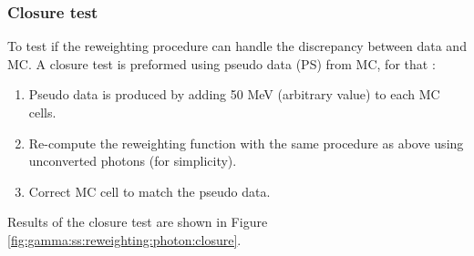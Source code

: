\subsubsection{Closure test}
To test if the reweighting procedure can handle the discrepancy between data and MC. A closure test is preformed using pseudo data (PS) from MC, for that :
\begin{enumerate}
    \item Pseudo data is produced by adding 50 MeV (arbitrary value) to each MC cells.
    \item Re-compute the reweighting function with the same procedure as above using unconverted photons (for simplicity).
    \item Correct MC cell to match the pseudo data.
\end{enumerate}
Results of the closure test are shown in Figure \ref{fig:gamma:ss:reweighting:photon:closure}. 
